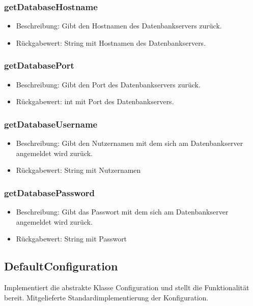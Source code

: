 \documentclass[a4paper]{scrreprt}
\begin{document}
	\subsubsection{getDatabaseHostname}
	\begin{itemize}
		\item Beschreibung: Gibt den Hostnamen des Datenbankservers zurück.
		\item Rückgabewert: String mit Hostnamen des Datenbankservers.
	\end{itemize}

	\subsubsection{getDatabasePort}
	\begin{itemize}
		\item Beschreibung: Gibt den Port des Datenbankservers zurück.
		\item Rückgabewert: int mit Port des Datenbankservers.
	\end{itemize}

	\subsubsection{getDatabaseUsername}
	\begin{itemize}
		\item Beschreibung: Gibt den Nutzernamen mit dem sich am Datenbankserver angemeldet wird zurück.
		\item Rückgabewert: String mit Nutzernamen
	\end{itemize}

	\subsubsection{getDatabasePassword}
	\begin{itemize}
		\item Beschreibung: Gibt das Passwort mit dem sich am Datenbankserver angemeldet wird zurück.
		\item Rückgabewert: String mit Passwort
	\end{itemize}

	\subsection{DefaultConfiguration}
	Implementiert die abstrakte Klasse Configuration und stellt die Funktionalität bereit.
	Mitgelieferte Standardimplementierung der Konfiguration.
\end{document}
